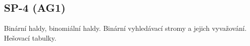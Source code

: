 \subsection{SP-4 (AG1)}
Binární haldy, binomiální haldy. Binární vyhledávací stromy a jejich vyvažování. Hešovací tabulky.